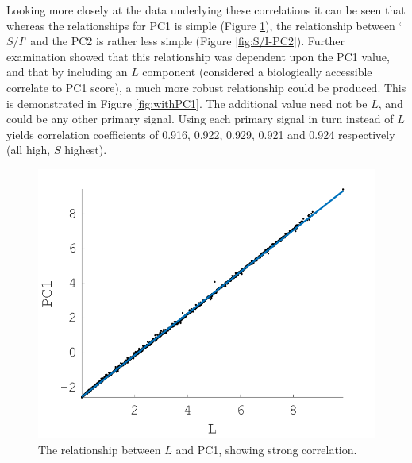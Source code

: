 Looking more closely at the data underlying these correlations it can be seen that whereas the relationships for \gls{PC1} is simple (Figure \ref{fig:L-PC1}), the relationship between `$S/I$' and the \gls{PC2} is rather less simple (Figure \ref{fig:S/I-PC2}). Further examination showed that this relationship was dependent upon the PC1 value, and that by including an $L$ component (considered a biologically accessible correlate to \gls{PC1} score), a much more robust relationship could be produced. This is demonstrated in Figure \ref{fig:withPC1}. The additional value need not be $L$, and could be any other primary signal. Using each primary signal in turn instead of $L$ yields correlation coefficients of 0.916, 0.922, 0.929, 0.921 and 0.924 respectively (all high, $S$ highest).

\begin{figure}[htbp]
 \includegraphics[max width=\textwidth]{figs/comp/melcomp_3/20.png}
 \caption{The relationship between $L$ and \gls{PC1}, showing strong correlation.}
 \label{fig:L-PC1}
\end{figure} 

